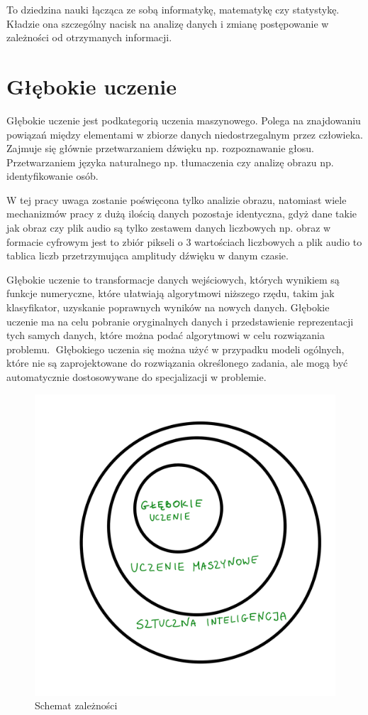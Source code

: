 \documentclass[brudnopis]{xmgr}
\begin{document}
To dziedzina nauki łącząca ze sobą informatykę, matematykę czy statystykę. Kładzie ona szczególny nacisk na analizę danych i zmianę postępowanie w zależności od otrzymanych informacji.

\section{Głębokie uczenie }

Głębokie uczenie jest podkategorią uczenia maszynowego. Polega na znajdowaniu powiązań między elementami w zbiorze danych niedostrzegalnym przez człowieka. Zajmuje się głównie przetwarzaniem dźwięku np. rozpoznawanie głosu. Przetwarzaniem języka naturalnego np. tłumaczenia czy analizę obrazu np. identyfikowanie osób.

W tej pracy uwaga zostanie poświęcona tylko analizie obrazu, natomiast wiele mechanizmów pracy z dużą ilością danych pozostaje identyczna, gdyż dane takie jak obraz czy plik audio są tylko zestawem danych liczbowych np. obraz w formacie cyfrowym jest to zbiór pikseli o 3 wartościach liczbowych a plik audio to tablica liczb przetrzymująca amplitudy dźwięku w danym czasie.

Głębokie uczenie to transformacje danych wejściowych, których wynikiem są funkcje numeryczne, które ułatwiają algorytmowi niższego rzędu, takim jak klasyfikator, uzyskanie poprawnych wyników na nowych danych. Głębokie uczenie ma na celu pobranie oryginalnych danych i przedstawienie reprezentacji tych samych danych, które można podać algorytmowi w celu rozwiązania problemu. 
􏰁Głębokiego uczenia się można użyć w przypadku modeli ogólnych, które nie są zaprojektowane do rozwiązania określonego zadania, ale mogą być automatycznie dostosowywane do specjalizacji w problemie.

\begin{figure}[!tbh]
\centering
\includegraphics[width=.8\hsize]{fig/1}
\caption{Schemat zależności\label{RYS.1}}
\end{figure}
\end{document}
